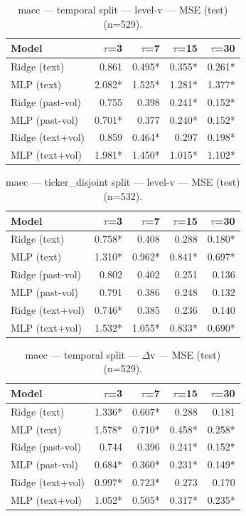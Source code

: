 \begin{table}[t]
\centering
\begin{tabular}{lrrrr}
\toprule
Model & $\tau$=3 & $\tau$=7 & $\tau$=15 & $\tau$=30 \\
\midrule
Ridge (text) & 0.861 & 0.495* & 0.355* & 0.261* \\
MLP (text) & 2.082* & 1.525* & 1.281* & 1.377* \\
Ridge (past-vol) & 0.755 & 0.398 & 0.241* & 0.152* \\
MLP (past-vol) & 0.701* & 0.377 & 0.240* & 0.152* \\
Ridge (text+vol) & 0.859 & 0.464* & 0.297 & 0.198* \\
MLP (text+vol) & 1.981* & 1.450* & 1.015* & 1.102* \\
\bottomrule
\end{tabular}
\caption{maec — temporal split — level-v — MSE (test) (n=529).}
\end{table}

\begin{table}[t]
\centering
\begin{tabular}{lrrrr}
\toprule
Model & $\tau$=3 & $\tau$=7 & $\tau$=15 & $\tau$=30 \\
\midrule
Ridge (text) & 0.758* & 0.408 & 0.288 & 0.180* \\
MLP (text) & 1.310* & 0.962* & 0.841* & 0.697* \\
Ridge (past-vol) & 0.802 & 0.402 & 0.251 & 0.136 \\
MLP (past-vol) & 0.791 & 0.386 & 0.248 & 0.132 \\
Ridge (text+vol) & 0.746* & 0.385 & 0.236 & 0.140 \\
MLP (text+vol) & 1.532* & 1.055* & 0.833* & 0.690* \\
\bottomrule
\end{tabular}
\caption{maec — ticker\_disjoint split — level-v — MSE (test) (n=532).}
\end{table}

\begin{table}[t]
\centering
\begin{tabular}{lrrrr}
\toprule
Model & $\tau$=3 & $\tau$=7 & $\tau$=15 & $\tau$=30 \\
\midrule
Ridge (text) & 1.336* & 0.607* & 0.288 & 0.181 \\
MLP (text) & 1.578* & 0.710* & 0.458* & 0.258* \\
Ridge (past-vol) & 0.744 & 0.396 & 0.241* & 0.152* \\
MLP (past-vol) & 0.684* & 0.360* & 0.231* & 0.149* \\
Ridge (text+vol) & 0.997* & 0.723* & 0.273 & 0.170 \\
MLP (text+vol) & 1.052* & 0.505* & 0.317* & 0.235* \\
\bottomrule
\end{tabular}
\caption{maec — temporal split — $\Delta$v — MSE (test) (n=529).}
\end{table}

